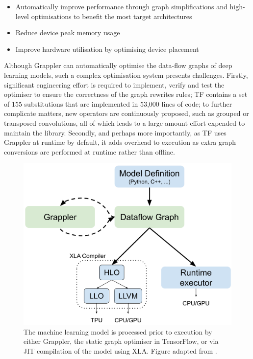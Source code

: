 \begin{itemize}
  \item Automatically improve performance through graph simplifications and high-level optimisations to benefit the most target architectures
  \item Reduce device peak memory usage
  \item Improve hardware utilisation by optimising device placement
\end{itemize}

Although Grappler can automatically optimise the data-flow graphs of deep learning models, such a complex optimisation system presents challenges. Firstly, significant engineering effort is required to implement, verify and test the optimiser to ensure the correctness of the graph rewrites rules; TF contains a set of 155 substitutions that are implemented in 53,000 lines of code; to further complicate matters, new operators are continuously proposed, such as grouped or transposed convolutions, all of which leads to a large amount effort expended to maintain the library. Secondly, and perhaps more importantly, as TF uses Grappler at runtime by default, it adds overhead to execution as extra graph conversions are performed at runtime rather than offline.

\begin{figure}[ht]
  \centering
  \includegraphics[width=0.75\columnwidth]{sections/3problem/images/GraphOptimiser}
  \caption[Architecture of graph optimisation system in TensorFlow]{The machine learning model is processed prior to execution by either Grappler, the static graph optimiser in TensorFlow, or via JIT compilation of the model using XLA. Figure adapted from \cite{larsen2019tensorflow}.}
  \label{fig:problem:graph-optim}
\end{figure}

